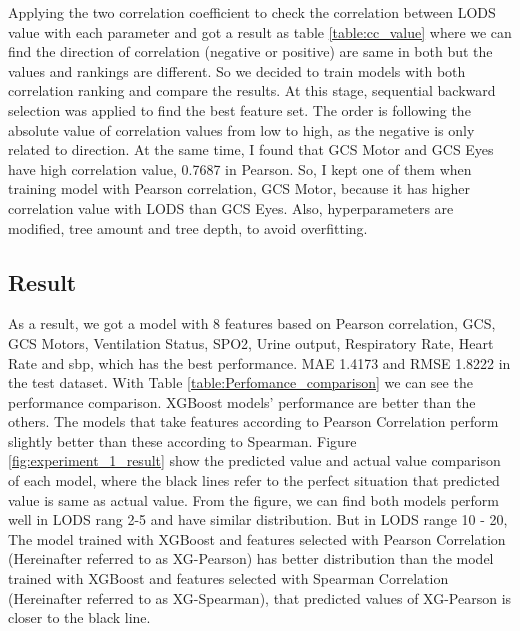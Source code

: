 \documentclass[12pt,a4paper,english
]{tunithesis}
\begin{document}
Applying the two correlation coefficient to check the correlation between LODS value with each parameter and got a result as table \ref{table:cc_value} where we can find the direction of correlation (negative or positive) are same in both but the values and rankings are different. So we  decided to train models with both correlation ranking and compare the results. At this stage, sequential backward selection was applied to find the best feature set. The order is following the absolute value of correlation values from low to high, as the negative is only related to direction. At the same time, I found that GCS Motor and GCS Eyes have high correlation value, 0.7687 in Pearson. So, I kept one of them when training model with Pearson correlation, GCS Motor, because it has higher correlation value with LODS than GCS Eyes. Also, hyperparameters are modified, tree amount and tree depth, to avoid overfitting. 

\subsection{Result}
As a result, we got a model with 8 features based on Pearson correlation, GCS, GCS Motors, Ventilation Status, SPO2, Urine output, Respiratory Rate, Heart Rate and sbp, which has the best performance. MAE 1.4173 and RMSE 1.8222 in the test dataset. With Table \ref{table:Perfomance_comparison} we can see the performance comparison. XGBoost models' performance are better than the others. The models that take features according to Pearson Correlation perform slightly better than these according to Spearman. Figure \ref{fig:experiment_1_result} show the predicted value and actual value comparison of each model, where the black lines refer to the perfect situation that predicted value is same as actual value. From the figure, we can find both models perform well in LODS rang 2-5 and have similar distribution. But in LODS range 10 - 20, The model trained with XGBoost and features selected with Pearson Correlation (Hereinafter referred to as XG-Pearson) has better distribution than the model trained with XGBoost and features selected with Spearman Correlation (Hereinafter referred to as XG-Spearman), that predicted values of XG-Pearson is closer to the black line.
\end{document}
